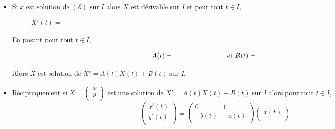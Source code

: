 \documentclass[french,11pt,twoside]{VcCours}
\begin{document}
\begin{itemize}
\item Si $x$ est solution de $(\mathcal{E})$ sur $I$ alors $X$ est dérivable sur $I$ et pour tout $t \in I$,
$$ X'(t) = \phantom{\begin{pmatrix}
x'(t) \\
x''(t) \\
\end{pmatrix} = \begin{pmatrix}
x'(t) \\
-a(t)x'(t)-b(t)x(t)+c(t) \\
\end{pmatrix} = \begin{pmatrix}
0 & 1 \\
-b(t) & - a(t) \\
\end{pmatrix} \begin{pmatrix}
x(t) \\
x'(t) \\
\end{pmatrix} + \begin{pmatrix}
0 \\
c(t)
\end{pmatrix}}$$
En posant pour tout $t \in I$,
$$ A(t) = \phantom{\begin{pmatrix}
0 & 1 \\
-b(t) & -a(t) \\
\end{pmatrix}} \; \hbox{ et } B(t) = \phantom{\begin{pmatrix}
0 \\
c(t)
\end{pmatrix}}$$
Alors $X$ est solution de $X'=A(t)X(t)+B(t)$ sur $I$.
\item Réciproquement si $X = \begin{pmatrix}
x \\
y \\
\end{pmatrix}$ est une solution de $X'=A(t)X(t)+B(t)$ sur $I$ alors pour tout $t \in I$,
$$\begin{pmatrix}
x'(t) \\
y'(t) \\
\end{pmatrix} =  \begin{pmatrix}
0 & 1 \\
-b(t) & - a(t) \\
\end{pmatrix} \begin{pmatrix}
x(t) \\

\end{pmatrix}$$
\end{itemize}
\end{document}
